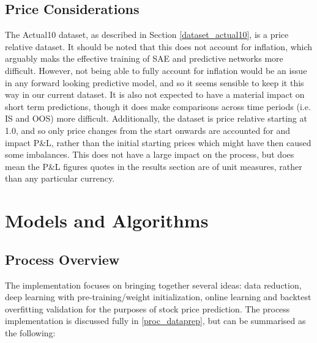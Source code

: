 \documentclass[a4paper,11pt,oneside]{article}
\theoremstyle{plain}
\theoremstyle{definition}
\begin{document}
\subsection{Price Considerations}\label{data_prices}

The Actual10 dataset, as described in Section \ref{dataset_actual10}, is a price relative dataset. It should be noted that this does not account for inflation, which arguably maks the effective training of SAE and predictive networks more difficult. However, not being able to fully account for inflation would be an issue in any forward looking predictive model, and so it seems sensible to keep it this way in our current dataset. It is also not expected to have a material impact on short term predictions, though it does make comparisons across time periods (i.e. IS and OOS) more difficult. Additionally, the dataset is price relative starting at 1.0, and so only price changes from the start onwards are accounted for and impact P\&L, rather than the initial starting prices which might have then caused some imbalances. This does not have a large impact on the process, but does mean the P\&L figures quotes in the results section are of unit measures, rather than any particular currency.

\newpage
\section{Models and Algorithms}\label{Implementation}
\subsection{Process Overview}\label{ProcessOverview}\label{imp_overview}


The implementation focuses on bringing together several ideas: data reduction, deep learning with pre-training/weight initialization, online learning and backtest overfitting validation for the purposes of stock price prediction. The process implementation is discussed fully in \ref{proc_dataprep}, but can be summarised as the following:
\end{document}
